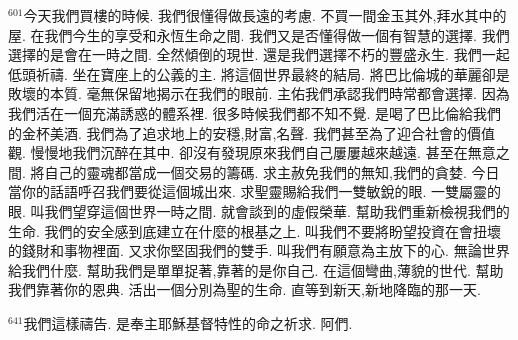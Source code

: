 \documentclass{book}
\begin{document}
$^{601}$今天我們買樓的時候.
我們很懂得做長遠的考慮.
不買一間金玉其外,拜水其中的屋.
在我們今生的享受和永恆生命之間.
我們又是否懂得做一個有智慧的選擇.
我們選擇的是會在一時之間.
全然傾倒的現世.
還是我們選擇不朽的豐盛永生.
我們一起低頭祈禱.
坐在寶座上的公義的主.
將這個世界最終的結局.
將巴比倫城的華麗卻是敗壞的本質.
毫無保留地揭示在我們的眼前.
主佑我們承認我們時常都會選擇.
因為我們活在一個充滿誘惑的體系裡.
很多時候我們都不知不覺.
是喝了巴比倫給我們的金杯美酒.
我們為了追求地上的安穩,財富,名聲.
我們甚至為了迎合社會的價值觀.
慢慢地我們沉醉在其中.
卻沒有發現原來我們自己屢屢越來越遠.
甚至在無意之間.
將自己的靈魂都當成一個交易的籌碼.
求主赦免我們的無知,我們的貪婪.
今日當你的話語呼召我們要從這個城出來.
求聖靈賜給我們一雙敏銳的眼.
一雙屬靈的眼.
叫我們望穿這個世界一時之間.
就會談到的虛假榮華.
幫助我們重新檢視我們的生命.
我們的安全感到底建立在什麼的根基之上.
叫我們不要將盼望投資在會扭壞的錢財和事物裡面.
又求你堅固我們的雙手.
叫我們有願意為主放下的心.
無論世界給我們什麼.
幫助我們是單單捉著,靠著的是你自己.
在這個彎曲,薄貌的世代.
幫助我們靠著你的恩典.
活出一個分別為聖的生命.
直等到新天,新地降臨的那一天.

$^{641}$我們這樣禱告.
是奉主耶穌基督特性的命之祈求.
阿們.
\newpage
\end{document}
